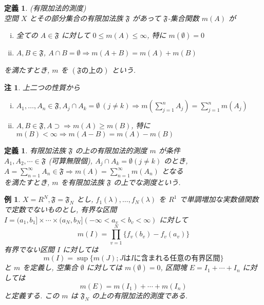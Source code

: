 \documentclass[dvipdfmx]{jsreport}
\newtheorem{defi}[theo]{定義}
\newtheorem{rema}[theo]{注}
\newtheorem{exam}[theo]{例}
\begin{document}
\begin{defi}
    (有限加法的測度) \\
    空間 $X$ とその部分集合の有限加法族 $\mathfrak{F}$ があって $\mathfrak{F}$-集合関数 $m(A)$ が
    \begin{enumerate}[(i)]
        \item 全ての $A \in \mathfrak{F}$ に対して $0 \leq m(A) \leq \infty$, 特に $m(\emptyset) = 0$
        \item $A, B \in \mathfrak{F}$, $A \cap B = \emptyset \Rightarrow m(A + B) = m(A) + m(B)$ 
    \end{enumerate}
    を満たすとき, $m$ を $(\mathfrak{F}の上の)$ という. 
\end{defi}
\begin{rema}
    上二つの性質から
    \begin{enumerate}[(i)]
        \item $\displaystyle A_1, \dots, A_n \in \mathfrak{F}, A_j \cap A_k = \emptyset \ (j \neq k) \Rightarrow m\left(\sum_{j = 1}^n A_j\right) = \sum_{j = 1}^n m(A_j)$
        \item $A, B \in \mathfrak{F}, A \supset \Rightarrow m(A) \geq m(B)$, 特に $m(B) < \infty \Rightarrow m(A - B) = m(A) - m(B)$
    \end{enumerate}
\end{rema}

\begin{defi}
    有限加法族 $\mathfrak{F}$ の上の有限加法的測度 $m$ が条件 \\
    $A_1, A_2, \cdots \in \mathfrak{F}$ (可算無限個), $A_j \cap A_k = \emptyset (j \neq k)$ のとき, $A = \sum_{n = 1}^\infty A_n \in \mathfrak{F} \Rightarrow m(A) = \sum_{n = 1}^\infty m(A_n)$ となる \\
    を満たすとき, $m$ を有限加法族 $\mathfrak{F}$ の上でな測度という. 
\end{defi}

\begin{exam} \label{finitely_additive_measure_example}
    $X = R^N, \mathfrak{F} = \mathfrak{F}_N$ とし, $f_1(\lambda), \dots, f_N(\lambda)$ を $R^1$ で単調増加な実数値関数で定数でないものとし, 有界な区間 $I = (a_1, b_1] \times \cdots \times (a_N, b_N] (-\infty < a_v < b_v < \infty)$ に対して
    \begin{equation}
        m(I) = \prod_{v = 1}^N \{f_v(b_v) - f_v(a_v)\}
    \end{equation}
    有界でない区間 $I$ に対しては
    \begin{equation}
        m(I) = \sup\{m(J) ; J は I に含まれる任意の有界区間\}
    \end{equation}
    と $m$ を定義し, 空集合 $\emptyset$ に対しては $m(\emptyset) = 0$, 区間塊 $E = I_1 + \cdots + I_n$ に対しては
    \begin{equation}
        m(E) = m(I_1) + \cdots + m(I_n)
    \end{equation}
    と定義する. この $m$ は $\mathfrak{F}_N$ の上の有限加法的測度である. 
\end{exam}
\end{document}
